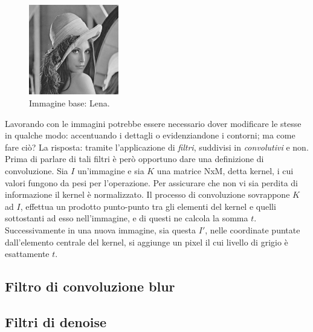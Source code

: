\documentclass{subfiles}
\begin{document}
\begin{figure}
    \centering
    \includegraphics[width = 0.35\textwidth]{../../Figure/Other/Lena/Lena.png}
    \caption{Immagine base: Lena.}
    \label{fig:3.1}
\end{figure}
Lavorando con le immagini potrebbe essere necessario dover modificare le stesse in qualche modo: accentuando i dettagli o evidenziandone i contorni; ma come fare ciò?
La risposta: tramite l'applicazione di \emph{filtri}, suddivisi in \emph{convolutivi} e non.
Prima di parlare di tali filtri è però opportuno dare una definizione di convoluzione\footnotemark[2].
Sia $I$ un'immagine e sia $K$ una matrice NxM, detta kernel\footnotemark[3], i cui valori fungono da pesi per l'operazione.
Per assicurare che non vi sia perdita di informazione il kernel è normalizzato.
Il processo di convoluzione sovrappone $K$ ad $I$, effettua un prodotto punto-punto tra gli elementi del kernel e quelli sottostanti ad esso nell'immagine,
e di questi ne calcola la somma $t$. Successivamente in una nuova immagine, sia questa $I'$, nelle coordinate puntate dall'elemento centrale del kernel,
si aggiunge un pixel il cui livello di grigio è esattamente $t$.

\subsection{Filtro di convoluzione blur}


\clearpage

\subsection{Filtri di denoise}

\end{document}

